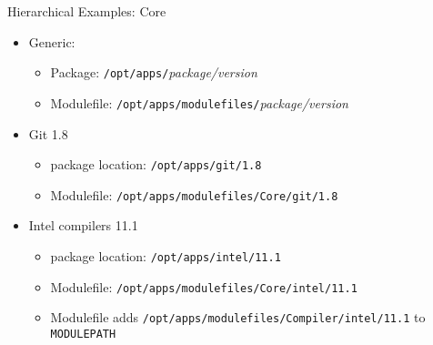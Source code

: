 \documentclass{beamer}
\begin{document}
\begin{frame}{Hierarchical Examples: Core}
  \begin{itemize}
    \item Generic:
      \begin{itemize}
        \item Package: \texttt{/opt/apps/}\emph{package/version}
        \item Modulefile: \texttt{/opt/apps/modulefiles/}\emph{package/version}
      \end{itemize}
    \item Git 1.8
      \begin{itemize}
        \item package location: \texttt{/opt/apps/git/1.8}
        \item Modulefile: \texttt{/opt/apps/modulefiles/Core/git/1.8}
      \end{itemize}
    \item Intel compilers 11.1
      \begin{itemize}
        \item package location: \texttt{/opt/apps/intel/11.1}
        \item Modulefile: \texttt{/opt/apps/modulefiles/Core/intel/11.1}
        \item Modulefile adds \texttt{/opt/apps/modulefiles/Compiler/intel/11.1} to \texttt{MODULEPATH}
      \end{itemize}
  \end{itemize}
\end{frame}
\end{document}
